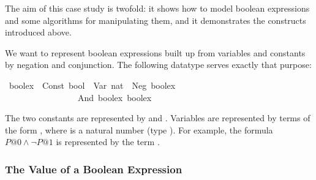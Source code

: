 %
\begin{isabellebody}%
\def\isabellecontext{Ifexpr}%
%
\isadelimtheory
%
\endisadelimtheory
%
\isatagtheory
%
\endisatagtheory
{\isafoldtheory}%
%
\isadelimtheory
%
\endisadelimtheory
%
\isamarkuptrue%
%
\begin{isamarkuptext}%
\label{sec:boolex}
The aim of this case study is twofold: it shows how to model boolean
expressions and some algorithms for manipulating them, and it demonstrates
the constructs introduced above.%
\end{isamarkuptext}%
\isamarkuptrue%
%
\isamarkuptrue%
%
\begin{isamarkuptext}%
We want to represent boolean expressions built up from variables and
constants by negation and conjunction. The following datatype serves exactly
that purpose:%
\end{isamarkuptext}%
\isamarkuptrue%
\isamarkupfalse%
\ boolex\ {}\ Const\ bool\ {}\ Var\ nat\ {}\ Neg\ boolex\isanewline
\ \ \ \ \ \ \ \ \ \ \ \ \ \ \ \ {}\ And\ boolex\ boolex%
\begin{isamarkuptext}%
\noindent
The two constants are represented by  and
. Variables are represented by terms of the form
, where  is a natural number (type ).
For example, the formula $P@0 \land \neg P@1$ is represented by the term
.

\subsubsection{The Value of a Boolean Expression}


\end{isamarkuptext}
\end{isabellebody}
